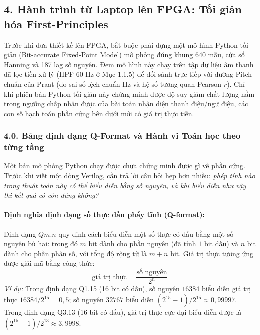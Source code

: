 \documentclass[11pt,a4paper]{article}
\begin{document}
\subsection*{4. Hành trình từ Laptop lên FPGA: Tối giản hóa First-Principles}

\begin{verifygate}
Trước khi đưa thiết kế lên FPGA, bắt buộc phải dựng một mô hình Python tối giản (Bit-accurate Fixed-Point Model) mô phỏng đúng khung 640 mẫu, cửa sổ Hanning và 187 lag số nguyên. Đem mô hình này chạy trên tập dữ liệu âm thanh đã lọc tiền xử lý (HPF 60 Hz ở Mục 1.1.5) để đối sánh trực tiếp với đường Pitch chuẩn của Praat (đo sai số lệch chuẩn Hz và hệ số tương quan Pearson $r$). Chỉ khi phiên bản Python tối giản này chứng minh được độ suy giảm chất lượng nằm trong ngưỡng chấp nhận được của bài toán nhận diện thanh điệu/ngữ điệu, các con số hạch toán phần cứng bên dưới mới có giá trị thực tiễn.
\end{verifygate}

\subsubsection*{4.0. Bảng định dạng Q-Format và Hành vi Toán học theo từng tầng}

Một bản mô phỏng Python chạy được chưa chứng minh được gì về phần cứng. Trước khi viết một dòng Verilog, cần trả lời câu hỏi hẹp hơn nhiều: \emph{phép tính nào trong thuật toán này có thể biểu diễn bằng số nguyên, và khi biểu diễn như vậy thì kết quả có còn đúng không?}

\paragraph{Định nghĩa định dạng số thực dấu phẩy tĩnh (Q-format):}
Định dạng $Qm.n$ quy định cách biểu diễn một số thực có dấu bằng một số nguyên bù hai: trong đó $m$ bit dành cho phần nguyên (đã tính $1$ bit dấu) và $n$ bit dành cho phần phân số, với tổng độ rộng từ là $m + n$ bit. Giá trị thực tương ứng được giải mã bằng công thức:
\begin{equation}
\text{giá\_trị\_thực} = \frac{\text{số\_nguyên}}{2^n}
\end{equation}
\textit{Ví dụ:} Trong định dạng Q1.15 (16 bit có dấu), số nguyên $16384$ biểu diễn giá trị thực $16384 / 2^{15} = 0{,}5$; số nguyên $32767$ biểu diễn $(2^{15}-1)/2^{15} \approx 0{,}99997$. Trong định dạng Q3.13 (16 bit có dấu), giá trị thực cực đại biểu diễn được là $(2^{15}-1)/2^{13} \approx 3{,}9998$.
\end{document}
